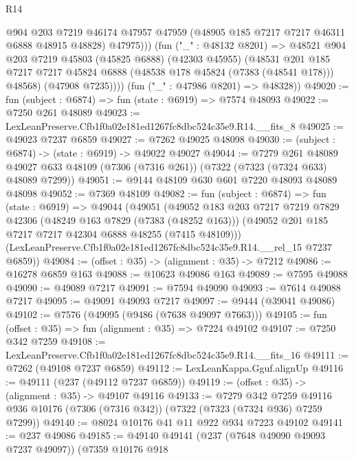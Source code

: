 \begin{lexlean}{R14}
\begin{coremodule}
                @904
                @203
                @7219
                @46174
                @47957
                @47959
                (@48905 @185 @7217 @7217 @46311 @6888 @48915 @48828)
                @47975)))
          (fun ("_" : @48132 @8201) =>
          @48521
            @904
            @203
            @7219
            @45803
            (@45825 @6888)
            (@42303 @45955)
            (@48531
              @201
              @185
              @7217
              @7217
              @45824
              @6888
              (@48538 @178 @45824 (@7383 (@48541 @178)))
              @48568)
            (@47908 @7235))))
      (fun ("_" : @47986 @8201) => @48328))
@49020 := fun (subject : @6874) => fun (state : @6919) => @7574 @48093
@49022 := @7250 @261 @48089
@49023 := LexLeanPreserve.Cfb1f0a02e181ed1267fc8dbc524c35e9.R14.__fits_8
@49025 := @49023 @7237 @6859
@49027 := @7262 @49025 @48098
@49030 := (subject : @6874) -> (state : @6919) -> @49022 @49027
@49044 := @7279
    @261
    @48089
    @49027
    @633
    @48109
    (@7306 (@7316 @261))
    (@7322 (@7323 (@7324 @633) @48089 @7299))
@49051 := @9144 @48109 @630 @601 @7220 @48093 @48089 @48098
@49052 := @7369 @48109
@49082 := fun (subject : @6874) =>
  fun (state : @6919) =>
  @49044
    (@49051
      (@49052
        @183
        @203
        @7217
        @7219
        @7829
        @42306
        (@48249 @163 @7829 (@7383 (@48252 @163)))
        (@49052 @201 @185 @7217 @7217 @42304 @6888 @48255 (@7415 @48109)))
      (LexLeanPreserve.Cfb1f0a02e181ed1267fc8dbc524c35e9.R14.__rel_15 @7237 @6859))
@49084 := (offset : @35) -> (alignment : @35) -> @7212
@49086 := @16278 @6859 @163
@49088 := @10623 @49086 @163
@49089 := @7595 @49088
@49090 := @49089 @7217
@49091 := @7594 @49090
@49093 := @7614 @49088 @7217
@49095 := @49091 @49093 @7217
@49097 := @9444 (@39041 @49086)
@49102 := @7576 (@49095 (@9486 (@7638 @49097 @7663)))
@49105 := fun (offset : @35) => fun (alignment : @35) => @7224 @49102
@49107 := @7250 @342 @7259
@49108 := LexLeanPreserve.Cfb1f0a02e181ed1267fc8dbc524c35e9.R14.__fits_16
@49111 := @7262 (@49108 @7237 @6859)
@49112 := LexLeanKappa.Gguf.alignUp
@49116 := @49111 (@237 (@49112 @7237 @6859))
@49119 := (offset : @35) -> (alignment : @35) -> @49107 @49116
@49133 := @7279
    @342
    @7259
    @49116
    @936
    @10176
    (@7306 (@7316 @342))
    (@7322 (@7323 (@7324 @936) @7259 @7299))
@49140 := @8024 @10176 @41 @11 @922 @934 @7223 @49102
@49141 := @237 @49086
@49185 := @49140
    @49141
    (@237 (@7648 @49090 @49093 @7237 @49097))
    (@7359
      @10176
      @918

\end{coremodule}
\end{lexlean}
